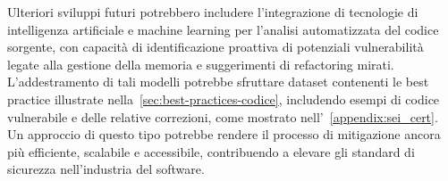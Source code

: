 Ulteriori sviluppi futuri potrebbero includere l'integrazione di tecnologie di intelligenza
artificiale e machine learning per l'analisi automatizzata del codice sorgente,
con capacità di identificazione proattiva di potenziali vulnerabilità legate
alla gestione della memoria e suggerimenti di refactoring mirati. L'addestramento
di tali modelli potrebbe sfruttare dataset contenenti le best practice illustrate
nella~\autoref{sec:best-practices-codice}, includendo esempi di codice
vulnerabile e delle relative correzioni, come mostrato nell'~\autoref{appendix:sei_cert}.
Un approccio di questo tipo potrebbe rendere il processo di mitigazione ancora più
efficiente, scalabile e accessibile, contribuendo a elevare gli standard di sicurezza
nell'industria del software.